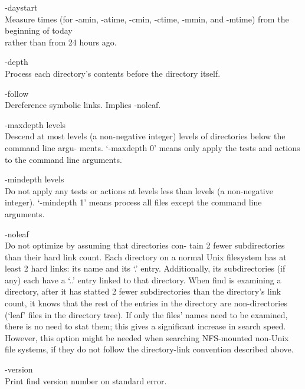 \begin{description}
       -daystart \\
              Measure  times  (for  -amin, -atime, -cmin, -ctime,
              -mmin, and -mtime)  from  the  beginning  of  today \\
              rather than from 24 hours ago.

       -depth  \\
              Process each directory's contents before the directory itself.

       -follow \\
              Dereference symbolic links.  Implies -noleaf.

       -maxdepth levels \\
              Descend at most  levels  (a  non-negative  integer)
              levels  of directories below the command line argu-
              ments.  `-maxdepth 0' means only  apply  the  tests
              and actions to the command line arguments.

       -mindepth levels \\
              Do  not  apply  any tests or actions at levels less
              than levels (a non-negative  integer).   `-mindepth
              1'  means process all files except the command line
              arguments.

       -noleaf \\
              Do not optimize by assuming that  directories  con-
              tain  2  fewer  subdirectories than their hard link
              count.  Each directory on a normal Unix  filesystem
              has  at  least  2  hard links: its name and its `.'
              entry.  Additionally, its subdirectories  (if  any)
              each  have  a `..'  entry linked to that directory.
              When find is examining a directory,  after  it  has
              statted 2 fewer subdirectories than the directory's
              link count, it knows that the rest of  the  entries
              in  the directory are non-directories (`leaf' files
              in the directory tree).  If only the  files'  names
              need to be examined, there is no need to stat them;
              this gives a significant increase in search  speed.
              However, this option might be needed when searching
              NFS-mounted non-Unix file systems, if they  do  not
              follow   the  directory-link  convention  described
              above.

       -version \\
              Print find version number on standard error.


\end{description}
